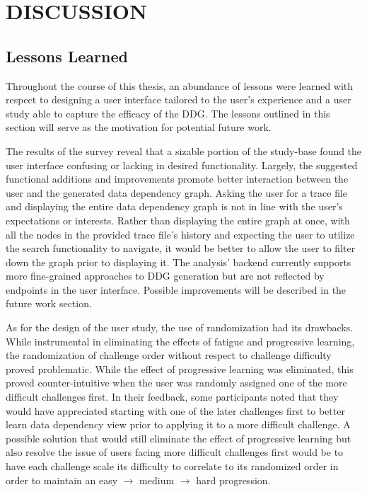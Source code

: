 \chapter{DISCUSSION}
\section{Lessons Learned}
Throughout the course of this thesis, an abundance of lessons were learned with respect to designing a user interface tailored to the user’s experience and a user study able to capture the efficacy of the DDG. The lessons outlined in this section will serve as the motivation for potential future work.  

The results of the survey reveal that a sizable portion of the study-base found the user interface confusing or lacking in desired functionality. Largely, the suggested functional additions and improvements promote better interaction between the user and the generated data dependency graph. Asking the user for a trace file and displaying the entire data dependency graph is not in line with the user’s expectations or interests. Rather than displaying the entire graph at once, with all the nodes in the provided trace file’s history and expecting the user to utilize the search functionality to navigate, it would be better to allow the user to filter down the graph prior to displaying it. The analysis’ backend currently supports more fine-grained approaches to DDG generation but are not reflected by endpoints in the user interface. Possible improvements will be described in the future work section.

As for the design of the user study, the use of randomization had its drawbacks. While instrumental in eliminating the effects of fatigue and progressive learning, the randomization of challenge order without respect to challenge difficulty proved problematic. While the effect of progressive learning was eliminated, this proved counter-intuitive when the user was randomly assigned one of the more difficult challenges first. In their feedback, some participants noted that they would have appreciated starting with one of the later challenges first to better learn data dependency view prior to applying it to a more difficult challenge. A possible solution that would still eliminate the effect of progressive learning but also resolve the issue of users facing more difficult challenges first would be to have each challenge scale its difficulty to correlate to its randomized order in order to maintain an easy $\xrightarrow[]{}$ medium $\xrightarrow[]{}$ hard progression.


